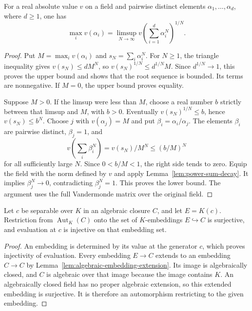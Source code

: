 \begin{lemma}\label{lem:power-sum-radius}
\leanok
{}
For a real absolute value $v$ on a field and pairwise distinct elements
$\alpha_1,\ldots,\alpha_d$, where $d\geq1$, one has
\[
 \max_i v(\alpha_i)
 =\limsup_{N\to\infty}v\left(\sum_{i=1}^d\alpha_i^N\right)^{1/N}.
\]
\end{lemma}
\begin{proof}
Put $M=\max_i v(\alpha_i)$ and $s_N=\sum_i\alpha_i^N$.
For $N\geq1$, the triangle inequality gives $v(s_N)\leq dM^N$,
so $v(s_N)^{1/N}\leq d^{1/N}M$. Since $d^{1/N}\to1$, this
proves the upper bound and shows that the root sequence is bounded.
Its terms are nonnegative. If $M=0$, the upper bound proves equality.

Suppose $M>0$. If the limsup were less than $M$, choose a real number
$b$ strictly between that limsup and $M$, with $b>0$. Eventually
$v(s_N)^{1/N}\leq b$, hence $v(s_N)\leq b^N$.
Choose $j$ with $v(\alpha_j)=M$ and put $\beta_i=\alpha_i/\alpha_j$.
The elements $\beta_i$ are pairwise distinct, $\beta_j=1$, and
\[
 v\left(\sum_i\beta_i^N\right)
 =v(s_N)/M^N\leq (b/M)^N
\]
for all sufficiently large $N$. Since $0<b/M<1$, the right side
tends to zero. Equip the field with the norm defined by $v$ and apply
Lemma~\ref{lem:power-sum-decay}. It implies $\beta_j^N\to0$,
contradicting $\beta_j^N=1$. This proves the lower bound.
The argument uses the full Vandermonde matrix over the original field.
\end{proof}

\begin{lemma}
\label{lem:separable-orbit-embeddings}
\leanok
{}
Let $c$ be separable over $K$ in an algebraic closure $C$, and let
$E=K(c)$. Restriction from $\operatorname{Aut}_K(C)$ onto the set of
$K$-embeddings $E\hookrightarrow C$ is surjective, and evaluation at
$c$ is injective on that embedding set.
\end{lemma}
\begin{proof}
An embedding is determined by its value at the generator $c$, which
proves injectivity of evaluation. Every embedding $E\to C$ extends
to an embedding $C\to C$ by Lemma~\ref{lem:algebraic-embedding-extension}.
Its image is algebraically closed, and $C$ is algebraic over that image
because the image contains $K$. An algebraically closed field has no
proper algebraic extension, so this extended embedding is surjective.
It is therefore an automorphism restricting to the given embedding.
\end{proof}


